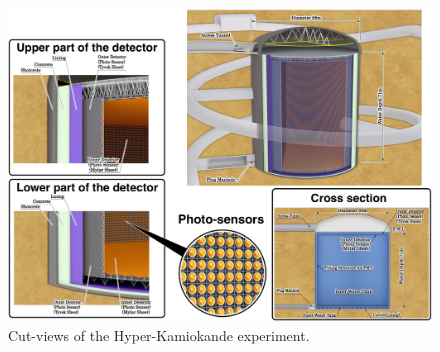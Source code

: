 \begin{figure}
	\centering
	\includegraphics[width=0.8\linewidth]{pics/hkonlytank.png}
	\caption[Views of the Hyper-Kamiokande experiment]{Cut-views of the Hyper-Kamiokande experiment.}
	\label{fig:hkdr}
\end{figure}

